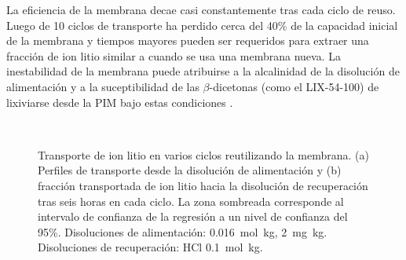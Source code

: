 La eficiencia de la membrana decae casi constantemente tras cada ciclo de reuso. Luego de 10 ciclos de transporte ha perdido cerca del 40\% de la capacidad inicial de la membrana y tiempos mayores pueden ser requeridos para extraer una fracción de ion litio similar a cuando se usa una membrana nueva. La inestabilidad de la membrana puede atribuirse a la alcalinidad de la di\-so\-lu\-ción de alimentación y a la suceptibilidad de las $\beta$-dicetonas (como el LIX-54-100) de lixiviarse desde la PIM bajo estas condiciones \citep{Sugiura1989}.

\begin{figure}[H]
    \centering
    \\
    \caption[Transporte de ion litio en varios ciclos reutilizando la membrana.]{Transporte de ion litio en varios ciclos reutilizando la membrana. (a) Perfiles de transporte desde la disolución de alimentación y (b) fracción transportada de ion litio hacia la disolución de recuperación tras seis horas en cada ciclo. La zona sombreada corresponde al intervalo de confianza de la regresión a un nivel de confianza del 95\%.  Disoluciones de alimentación:  0.016~mol~kg\mnn,  2~mg~kg\mnn. Disoluciones de recuperación: HCl 0.1~mol~kg\mnn.}
    \label{fig:cycles}
\end{figure}

